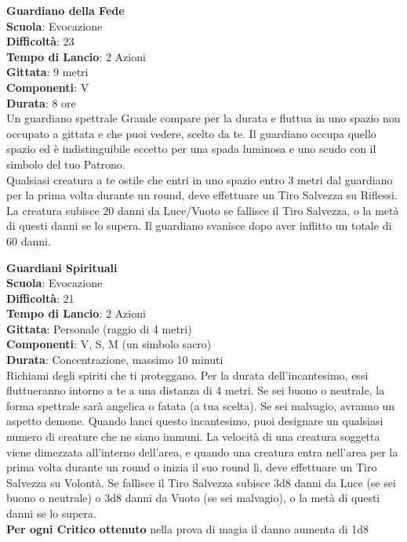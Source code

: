 \begin{multicols}{2}
\medskip\textbf{Guardiano della Fede}\\
\textbf{Scuola}: Evocazione\\
\textbf{Difficoltà}: 23\\
\textbf{Tempo di Lancio}: 2 Azioni\\
\textbf{Gittata}: 9 metri\\
\textbf{Componenti}: V\\
\textbf{Durata}: 8 ore\\
Un guardiano spettrale Grande compare per la durata e fluttua in uno spazio non occupato a gittata e che puoi vedere, scelto da te. Il guardiano occupa quello spazio ed è indistinguibile eccetto per una spada luminosa e uno scudo con il simbolo del tuo Patrono.\\
Qualsiasi creatura a te ostile che entri in uno spazio entro 3 metri dal guardiano per la prima volta durante un round, deve effettuare un Tiro Salvezza su Riflessi. La creatura subisce 20 danni da Luce/Vuoto se fallisce il Tiro Salvezza, o la metà di questi danni se lo supera. Il guardiano svanisce dopo aver inflitto un totale di 60 danni.

\medskip\textbf{Guardiani Spirituali}\\
\textbf{Scuola}: Evocazione\\
\textbf{Difficoltà}: 21\\
\textbf{Tempo di Lancio}: 2 Azioni\\
\textbf{Gittata}: Personale (raggio di 4 metri)\\
\textbf{Componenti}: V, S, M (un simbolo sacro)\\
\textbf{Durata}: Concentrazione, massimo 10 minuti\\
Richiami degli spiriti che ti proteggano. Per la durata dell'incantesimo, essi fluttueranno intorno a te a una distanza di 4 metri. Se sei buono o neutrale, la forma spettrale sarà angelica o fatata (a tua scelta). Se sei malvagio, avranno un aspetto demone. Quando lanci questo incantesimo, puoi designare un qualsiasi numero di creature che ne siano immuni. La velocità di una creatura soggetta viene dimezzata all'interno dell'area, e quando una creatura entra nell'area per la prima volta durante un round o inizia il suo round lì, deve effettuare un Tiro Salvezza su Volontà. Se fallisce il Tiro Salvezza subisce 3d8 danni da Luce (se sei buono o neutrale) o 3d8 danni da Vuoto (se sei malvagio), o la metà di questi danni se lo supera.\\
\textbf{Per ogni Critico ottenuto} nella prova di magia il danno aumenta di 1d8 \\


\end{multicols}
